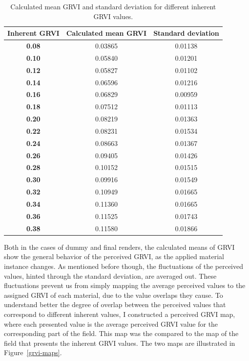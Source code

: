 \begin{table}[htb]
    \centering
    \caption{Calculated mean GRVI and standard deviation for different inherent GRVI values.}
    \label{grvi_stats_ld}
    \renewcommand{\arraystretch}{1.15}
    \begin{tabular}{c!{\vrule width 1.2pt}cc}
        \hline
        \textbf{Inherent GRVI} & \textbf{Calculated mean GRVI} & \textbf{Standard deviation} \\
        \hline
        \textbf{0.08} & 0.03865 & 0.01138 \\
        \textbf{0.10} & 0.05840 & 0.01201 \\
        \textbf{0.12} & 0.05827 & 0.01102 \\
        \textbf{0.14} & 0.06596 & 0.01216 \\
        \textbf{0.16} & 0.06829 & 0.00959 \\
        \textbf{0.18} & 0.07512 & 0.01113 \\
        \textbf{0.20} & 0.08219 & 0.01363 \\
        \textbf{0.22} & 0.08231 & 0.01534 \\
        \textbf{0.24} & 0.08663 & 0.01367 \\
        \textbf{0.26} & 0.09405 & 0.01426 \\
        \textbf{0.28} & 0.10152 & 0.01515 \\
        \textbf{0.30} & 0.09916 & 0.01549 \\
        \textbf{0.32} & 0.10949 & 0.01665 \\
        \textbf{0.34} & 0.11360 & 0.01665 \\
        \textbf{0.36} & 0.11525 & 0.01743 \\
        \textbf{0.38} & 0.11580 & 0.01866 \\
        \hline
    \end{tabular}
\end{table}

Both in the cases of dummy and final renders, the calculated means of GRVI show the general behavior of the perceived GRVI, as the applied material instance changes. As mentioned before though, the fluctuations of the perceived values, hinted through the standard deviation, are averaged out. These fluctuations prevent us from simply mapping the average perceived values to the assigned GRVI of each material, due to the value overlaps they cause. To understand better the degree of overlap between the perceived values that correspond to different inherent values, I constructed a perceived GRVI map, where each presented value is the average perceived GRVI value for the corresponding part of the field. This map was the compared to the map of the field that presents the inherent GRVI values. The two maps are illustrated in Figure~\ref{grvi-maps}. 

